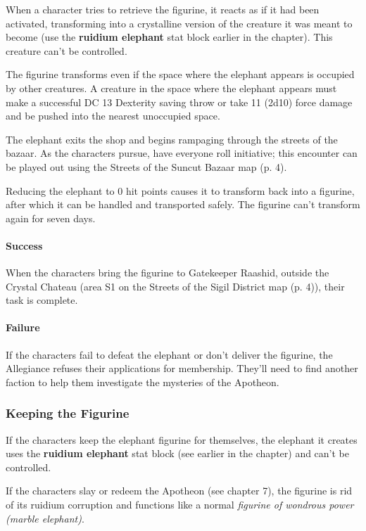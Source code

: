 \documentclass[a4paper, 11pt, bg=full, twocolumn, nooutline]{dndbook}
\begin{document}
When a character tries to retrieve the figurine, it reacts as if it had been activated, transforming into a crystalline version of the creature it was meant to become (use the \textbf{ruidium elephant} stat block earlier in the chapter). This creature can't be controlled.

The figurine transforms even if the space where the elephant appears is occupied by other creatures. A creature in the space where the elephant appears must make a successful DC 13 Dexterity saving throw or take 11 (2d10) force damage and be pushed into the nearest unoccupied space.

The elephant exits the shop and begins rampaging through the streets of the bazaar. As the characters pursue, have everyone roll initiative; this encounter can be played out using the Streets of the Suncut Bazaar map (p. 4).

Reducing the elephant to 0 hit points causes it to transform back into a figurine, after which it can be handled and transported safely. The figurine can't transform again for seven days.

\paragraph{Success}

When the characters bring the figurine to Gatekeeper Raashid, outside the Crystal Chateau (area S1 on the Streets of the Sigil District map (p. 4)), their task is complete.

\paragraph{Failure}

If the characters fail to defeat the elephant or don't deliver the figurine, the Allegiance refuses their applications for membership. They'll need to find another faction to help them investigate the mysteries of the Apotheon.

\subsubsection{Keeping the Figurine}

If the characters keep the elephant figurine for themselves, the elephant it creates uses the \textbf{ruidium elephant} stat block (see earlier in the chapter) and can't be controlled.

If the characters slay or redeem the Apotheon (see chapter 7), the figurine is rid of its ruidium corruption and functions like a normal \textit{figurine of wondrous power (marble elephant)}.
\end{document}
